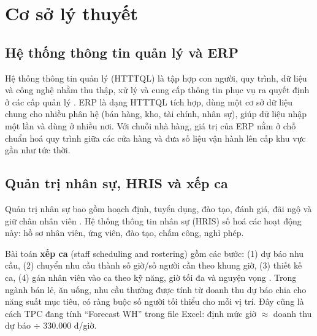 \documentclass[12pt,a4paper,oneside]{report}
\begin{document}
\chapter{Cơ sở lý thuyết}

\section{Hệ thống thông tin quản lý và ERP}
Hệ thống thông tin quản lý (HTTTQL) là tập hợp con người, quy trình, dữ liệu và công nghệ nhằm thu thập, xử lý và cung cấp thông tin phục vụ ra quyết định ở các cấp quản lý \cite{laudon}. ERP là dạng HTTTQL tích hợp, dùng một cơ sở dữ liệu chung cho nhiều phân hệ (bán hàng, kho, tài chính, nhân sự), giúp dữ liệu nhập một lần và dùng ở nhiều nơi. Với chuỗi nhà hàng, giá trị của ERP nằm ở chỗ chuẩn hoá quy trình giữa các cửa hàng và đưa số liệu vận hành lên cấp khu vực gần như tức thời.

\section{Quản trị nhân sự, HRIS và xếp ca}
Quản trị nhân sự bao gồm hoạch định, tuyển dụng, đào tạo, đánh giá, đãi ngộ và giữ chân nhân viên \cite{dessler}. Hệ thống thông tin nhân sự (HRIS) số hoá các hoạt động này: hồ sơ nhân viên, ứng viên, đào tạo, chấm công, nghỉ phép.

Bài toán \textbf{xếp ca} (staff scheduling and rostering) gồm các bước: (1) dự báo nhu cầu, (2) chuyển nhu cầu thành số giờ/số người cần theo khung giờ, (3) thiết kế ca, (4) gán nhân viên vào ca theo kỹ năng, giờ tối đa và nguyện vọng \cite{ernst}. Trong ngành bán lẻ, ăn uống, nhu cầu thường được tính từ doanh thu dự báo chia cho năng suất mục tiêu, có ràng buộc số người tối thiểu cho mỗi vị trí. Đây cũng là cách TPC đang tính ``Forecast WH'' trong file Excel: định mức giờ $\approx$ doanh thu dự báo $\div$ 330.000 đ/giờ.
\end{document}

